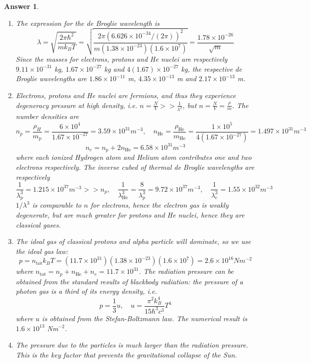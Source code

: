 \documentclass[a4paper]{article}
\newtheorem{ans}{Answer}[section]
\theoremstyle{new}
\begin{document}
\begin{ans}\leavevmode
\begin{enumerate}[label=(\alph*)]
\item The expression for the de Broglie wavelength is
$$\lambda=\sqrt{\frac{2\pi\hbar^2}{mk_BT}}=\sqrt{\frac{2\pi(6.626\times10^{-34}/(2\pi))^2}{m(1.38\times10^{-23})(1.6\times10^7)}}=\frac{1.78\times10^{-26}}{\sqrt{m}}$$
Since the masses for electrons, protons and He nuclei are respectively $9.11\times10^{-31}$ kg, $1.67\times10^{-27}$ kg and $4(1.67)\times10^{-27}$ kg, the respective de Broglie wavelengths are $1.86\times10^{-11}$ m, $4.35\times10^{-13}$ m and $2.17\times10^{-13}$ m.
\item Electrons, protons and He nuclei are fermions, and thus they experience degeneracy pressure at high density, i.e. $n=\frac{N}{V}>>\frac{1}{\lambda^3}$, but $n=\frac{N}{V}=\frac{\rho}{m}$. The number densities are
$$n_p=\frac{\rho_H}{m_p}=\frac{6\times10^4}{1.67\times10^{-27}}=3.59\times10^{31}m^{-3},\quad n_{\text{He}}=\frac{\rho_{\text{He}}}{m_{\text{He}}}=\frac{1\times10^5}{4(1.67\times10^{-27})}=1.497\times10^{31}m^{-3}$$
$$n_e=n_p+2n_{\text{He}}=6.58\times10^{31}m^{-3}$$
where each ionized Hydrogen atom and Helium atom contributes one and two electrons respectively. The inverse cubed of thermal de Broglie wavelengths are respectively
$$\frac{1}{\lambda^3_p}=1.215\times10^{37}m^{-3}>>n_p,\quad\frac{1}{\lambda^3_{\text{He}}}=\frac{8}{\lambda^3_p}=9.72\times10^{37}m^{-3},\quad\frac{1}{\lambda_e^3}=1.55\times10^{32}m^{-3}$$
$1/\lambda^3$ is comparable to $n$ for electrons, hence the electron gas is weakly degenerate, but are much greater for protons and He nuclei, hence they are classical gases.
\item The ideal gas of classical protons and alpha particle will dominate, so we use the ideal gas law:
$$p=n_{\text{tot}}k_BT=(11.7\times10^{31})(1.38\times10^{-23})(1.6\times10^7)=2.6\times10^{16}Nm^{-2}$$
where $n_{\text{tot}}=n_p+n_{\text{He}}+n_e=11.7\times10^{31}$. The radiation pressure can be obtained from the standard results of blackbody radiation: the pressure of a photon gas is a third of its energy density, i.e.
$$p=\frac{1}{3}u,\quad u=\frac{\pi^2k_B^4}{15\hbar^3c^3}T^4$$
where $u$ is obtained from the Stefan-Boltzmann law. The numerical result is $1.6\times10^{13}$ Nm$^{-2}$.
\item The pressure due to the particles is much larger than the radiation pressure. This is the key factor that prevents the gravitational collapse of the Sun.
\end{enumerate}
\end{ans}
\end{document}
